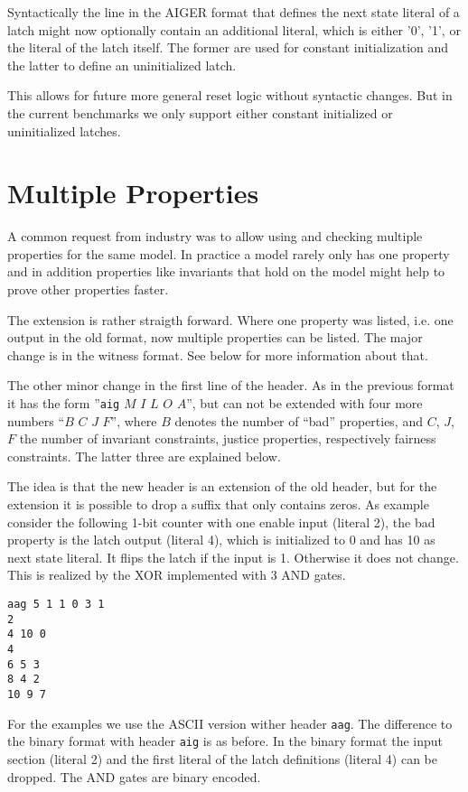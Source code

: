 \documentclass{llncs}
\begin{document}
Syntactically the line in the AIGER format that defines the next state
literal of a latch might now optionally contain an additional literal, which
is either '0', '1', or the literal of the latch itself.  The former are used
for constant initialization and the latter to define an uninitialized latch.

This allows for future more general reset logic without syntactic changes.
But in the current benchmarks we only support either constant initialized or
uninitialized latches.

\section{Multiple Properties}

A common request from industry was to allow using and checking multiple
properties for the same model.  In practice a model rarely only has one
property and in addition properties like invariants that hold on the model
might help to prove other properties faster.

The extension is rather straigth forward.  Where one property was listed,
i.e. one output in the old format, now multiple properties can be listed.
The major change is in the witness format.  See below for more information
about that.

The other minor change in the first line of the header.  As in the previous
format it has the form ''\texttt{aig} $M$ $I$ $L$ $O$ $A$'', but can not be
extended with four more numbers ``$B$ $C$ $J$ $F$'', where $B$ denotes the
number of ``bad'' properties, and $C$, $J$, $F$ the number of
invariant constraints, justice properties, respectively fairness
constraints.  The latter three are explained below.

The idea is that the new header is an extension of the old header,
but for the extension it is possible to drop a suffix that only contains
zeros.  As example consider the following 1-bit counter with one enable
input (literal 2),  the bad property is the latch output (literal 4), which
is initialized to 0 and has 10 as next state literal.  It flips the latch if
the input is 1.  Otherwise it does not change.  This is realized by the XOR
implemented with 3 AND gates.
{\small
\begin{verbatim}
aag 5 1 1 0 3 1
2
4 10 0
4
6 5 3
8 4 2
10 9 7
\end{verbatim}}
For the examples we use the ASCII
version wither header \texttt{aag}.  The difference to the binary format
with header \texttt{aig} is as before.  In the binary format
the input section (literal 2) and the first literal of the latch definitions
(literal 4) can be dropped.  The AND gates are binary encoded.
\end{document}

